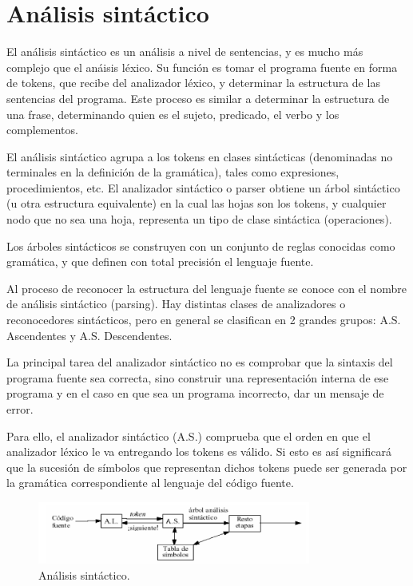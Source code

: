\section{An\'alisis sint\'actico}

El an\'alisis sint\'actico es un an\'alisis a nivel de sentencias, y es mucho m\'as complejo que el an\'aisis l\'exico. Su funci\'on es tomar el programa fuente en forma de tokens, que recibe del analizador l\'exico, y determinar la estructura de las sentencias del programa. Este proceso es similar a determinar la estructura de una frase, determinando quien es el sujeto, predicado, el verbo y los complementos.

El an\'alisis sint\'actico agrupa a los tokens en clases sint\'acticas (denominadas no terminales en la definici\'on de la gram\'atica), tales como expresiones, procedimientos, etc.
El analizador sint\'actico o parser obtiene un \'arbol sint\'actico (u otra estructura equivalente) en la cual las hojas son los tokens, y cualquier nodo que no sea una hoja, representa un tipo de clase sint\'actica (operaciones).

Los \'arboles sint\'acticos se construyen con un conjunto de reglas conocidas como gram\'atica, y que definen con total precisi\'on el lenguaje fuente.

Al proceso de reconocer la estructura del lenguaje fuente se conoce con el nombre de an\'alisis sint\'actico (parsing). Hay distintas clases de analizadores o reconocedores sint\'acticos, pero en general se clasifican en 2 grandes grupos: A.S. Ascendentes y A.S. Descendentes.

La principal tarea del analizador sint\'actico no es comprobar que la sintaxis del programa fuente sea correcta, sino construir una representaci\'on interna de ese programa y en el caso en que sea un programa incorrecto, dar un mensaje de error.

Para ello, el analizador sint\'actico (A.S.) comprueba que el orden en que el analizador l\'exico le va entregando los tokens es v\'alido. Si esto es as\'i significar\'a que la sucesi\'on de s\'imbolos que representan dichos tokens puede ser generada por
la gram\'atica correspondiente al lenguaje del c\'odigo fuente. \cite{sintac}

	\begin{figure}[htbp!]
		\centering
			\includegraphics[width=0.8\textwidth]{images/analizadorS}
		\caption{An\'alisis sint\'actico.}
	\end{figure}
	
	\pagebreak
	
